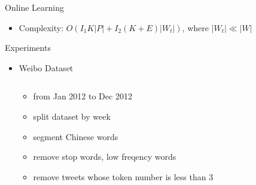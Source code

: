 \documentclass{beamer}
\begin{document}
\begin{frame}
\begin{columns}[T]
\begin{column}{.46\textwidth}
{\begin{block}{Online Learning}
\begin{itemize}
\begin{itemize}
\begin{figure}[H]
{        } \hspace{1in}
\end{figure}
\item Complexity: \(O(I_1 K|P|+I_2 (K+E)|W_t|)\), where \(|W_t|\ll |W| \)

\end{itemize}

\end{itemize}
\end{block}

\begin{block}{Experiments}
\begin{itemize}
	\item Weibo Dataset
        \begin{columns}
                \begin{column}{.55\textwidth}
                        \begin{itemize}
                                \begin{itemize}
                                        \item \footnotesize{from Jan 2012 to Dec 2012}
                                        \item\footnotesize{split dataset by week}
                                        \item \footnotesize{segment Chinese words}
                                        \item \footnotesize{remove stop words, low freqency words}
                                        \item \footnotesize{remove tweets whose token number is less than 3}
                                \end{itemize}
                        \end{itemize}
                \end{column}
                \begin{column}{.45\textwidth}
                        \begin{table}
                                \centering
                                \caption{\scriptsize{statistics of processed dataset}}
\end{table}
\end{column}
\end{columns}
\end{itemize}
\end{block}}
\end{column}
\end{columns}
\end{frame}
\end{document}
